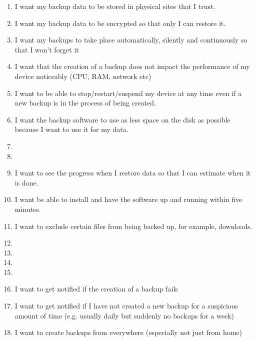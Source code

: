 \begin{enumerate}
	\item   I want my backup data to be stored in physical sites that I trust.
	\item	I want my backup data to be encrypted so that only I can restore it.
	\item	I want my backups to take place automatically, silently and continuously so that I won't forget it
	\item	I want that the creation of a backup does not impact the performance of my device noticeably (CPU, RAM, network etc)
	\item	I want to be able to stop/restart/suspend my device at any time even if a new backup is in the process of being created.
	\item	I want the backup software to use as less space on the disk as possible because I want to use it for my data.
	\item {}
	\item	{}
	\item	I want to see the progress when I restore data so that I can estimate when it is done.
	\item	I want be able to install and have the software up and running within five minutes.
	\item	I want to exclude certain files from being backed up, for example, downloads.
	\item	{}
	\item	{}
	\item	{}
	\item	{}
	\item	I want to get notified if the creation of a backup fails
	\item	I want to get notified if I have not created a new backup for a suspicious amount of time (e.g. usually daily but suddenly no backups for a week)
	\item	I want to create backups from everywhere (especially not just from home)

\end{enumerate}
